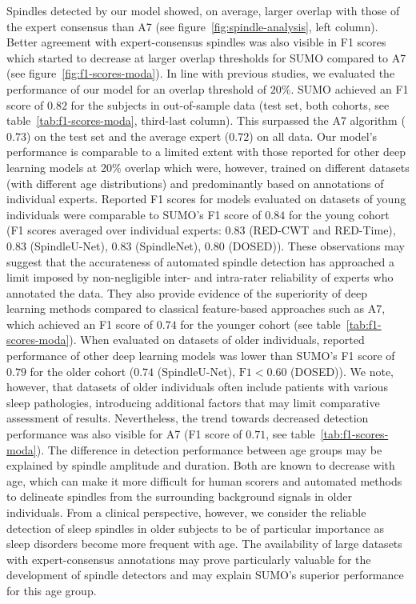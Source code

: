 \documentclass[fleqn,twocolumn,10pt]{wlscirep}
\begin{document}
Spindles detected by our model showed, on average, larger overlap with those
of the expert consensus than A7 (see figure~\ref{fig:spindle-analysis}, left
column).
Better agreement with expert-consensus spindles was also visible in F1 scores
which started to decrease at larger overlap thresholds for SUMO compared to A7
(see figure~\ref{fig:f1-scores-moda}).
In line with previous
studies\cite{Warby2014,Lacourse2019,Lacourse2020,Tapia2020}, we evaluated the
performance of our model for an overlap threshold of $20\%$.
SUMO achieved an F1 score of $0.82$ for the subjects in out-of-sample data (test
set, both cohorts, see table~\ref{tab:f1-scores-moda}, third-last column).
This surpassed the A7 algorithm ($0.73$) on the test set and the average expert
($0.72$) on all data.
Our model's performance is comparable to a limited extent with those reported
for other deep learning models at 20\% overlap which were, however, trained on
different datasets (with different age distributions) and predominantly based on
annotations of individual experts.
Reported F1 scores for models evaluated on datasets of young individuals were
comparable to SUMO's F1 score of $0.84$ for the young cohort (F1 scores averaged
over individual experts: $0.83$ (RED-CWT and RED-Time)\cite{Tapia2020}, $0.83$
(SpindleU-Net)\cite{You2021}, $0.83$ (SpindleNet)\cite{Tapia2020}, $0.80$
(DOSED)\cite{Tapia2020}).
These observations may suggest that the accurateness of automated spindle
detection has approached a limit imposed by non-negligible inter- and
intra-rater reliability of experts who annotated the data.
They also provide evidence of the superiority of deep learning
methods compared to classical feature-based approaches such as A7, which
achieved an F1 score of $0.74$ for the younger cohort (see
table~\ref{tab:f1-scores-moda}).
When evaluated on datasets of older individuals, reported performance of other
deep learning models was lower than SUMO's F1 score of $0.79$ for the older
cohort ($0.74$ (SpindleU-Net)\cite{You2021}, $\text{F1}<0.60$
(DOSED)\cite{Chambon2019}).
We note, however, that datasets of older individuals often include patients with
various sleep pathologies, introducing additional factors that may limit
comparative assessment of results.
Nevertheless, the trend towards decreased detection performance was also visible
for A7 (F1 score of $0.71$, see table~\ref{tab:f1-scores-moda}).
The difference in detection performance between age groups may be explained by
spindle amplitude and duration.
Both are known to decrease with age\cite{Nicolas2001,Crowley2002}, which can
make it more difficult for human scorers and automated methods to delineate
spindles from the surrounding background signals in older
individuals\cite{Wendt2015}.
From a clinical perspective, however, we consider the reliable detection of sleep
spindles in older subjects to be of particular importance as sleep disorders
become more frequent with age.
The availability of large datasets with expert-consensus annotations may prove
particularly valuable for the development of spindle detectors and may explain
SUMO's superior performance for this age group.
\end{document}
